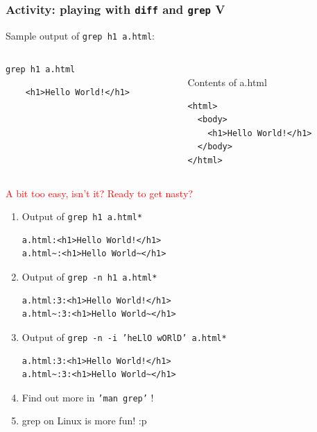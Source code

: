\begin{frame}[fragile]
\frametitle{Activity: playing with \texttt{diff} and \texttt{grep} V}
Sample output of \texttt{grep h1 a.html}:

\begin{columns}
\begin{column}{0.5\textwidth}
\texttt{grep h1 a.html}

\begin{verbatim}
    <h1>Hello World!</h1>
\end{verbatim}
\end{column}

\begin{column}{0.5\textwidth}
\\Contents of a.html
\begin{verbatim}
<html>
  <body>
    <h1>Hello World!</h1>
  </body>
</html>
\end{verbatim}
\end{column}
\end{columns}

\pause
\textcolor{red}{A bit too easy, isn't it? Ready to get nasty?}
\end{frame}



\begin{frame}[fragile]
\begin{enumerate}

\item Output of \texttt{grep h1 a.html*}

\begin{verbatim}
a.html:<h1>Hello World!</h1>
a.html~:<h1>Hello World~</h1>
\end{verbatim}

\pause
\item Output of \texttt{grep -n h1 a.html*}
\begin{verbatim}
a.html:3:<h1>Hello World!</h1>
a.html~:3:<h1>Hello World~</h1>
\end{verbatim}

\pause
\item Output of \texttt{grep -n -i 'heLlO wORlD' a.html*}
\begin{verbatim}
a.html:3:<h1>Hello World!</h1>
a.html~:3:<h1>Hello World~</h1>
\end{verbatim}

\pause
\item Find out more in \texttt{'man grep'} !
\pause
\item grep on Linux is more fun! :p
\end{enumerate}
\end{frame}



